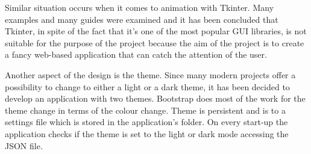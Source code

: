 \documentclass[12pt]{report}
\begin{document}
Similar situation occurs when it comes to animation with Tkinter. Many examples and many guides were examined and 
it has been concluded that Tkinter, in spite of the fact that it's one of the most popular GUI libraries, is not
suitable for the purpose of the project because the aim of the project is to create a fancy web-based application
that can catch the attention of the user.

Another aspect of the design is the theme. Since many modern projects offer a possibility to change to 
either a light or a dark theme, it has been decided to develop an application with two themes. Bootstrap 
does most of the work for the theme change in terms of the colour change. Theme is persistent and is to a
settings file which is stored in the application's folder. On every start-up the application checks if the
theme is set to the light or dark mode accessing the JSON file.
\end{document}
